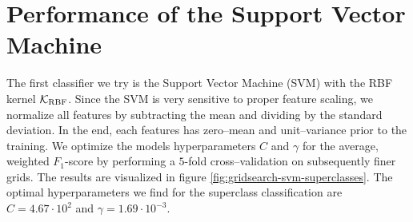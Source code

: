\section{Performance of the Support Vector Machine}
\label{sec:performance-svm}

The first classifier we try is the Support Vector Machine (SVM) with the RBF kernel $\mathcal{K}_{\text{RBF}}$. Since the SVM is very sensitive to proper feature scaling, we normalize all features by subtracting the mean and dividing by the standard deviation. In the end, each features has zero--mean and unit--variance prior to the training. We optimize the models hyperparameters $C$ and $\gamma$ for the average, weighted $F_1$-score by performing a $5$-fold cross--validation on subsequently finer grids. The results are visualized in figure \ref{fig:gridsearch-svm-superclasses}. The optimal hyperparameters we find for the superclass classification are $C = 4.67 \cdot 10^{2}$ and $\gamma = 1.69 \cdot 10^{-3}$.\\

